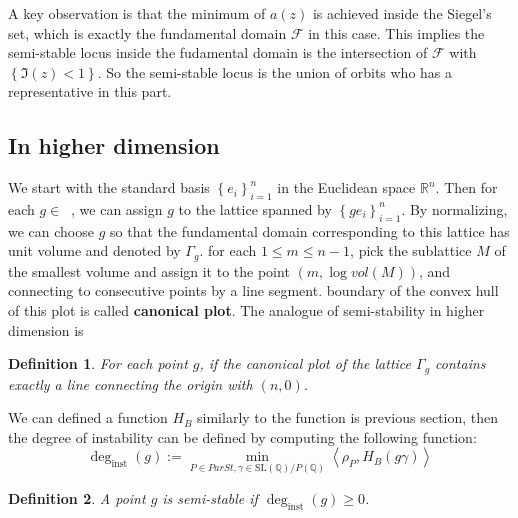 \documentclass[12pt]{article} %
\newtheorem{definition}{Definition}
\DeclareMathOperator{\slnr}{SL_n(\mathbb{R})}
\begin{document}
    A key observation is that the minimum of $a(z)$ is achieved inside the Siegel's set, which is exactly the fundamental domain $\mathcal{F}$ in this case. This implies the semi-stable locus inside the fudamental domain
    is the intersection of $\mathcal{F}$ with $\left\lbrace \Im(z)<1\right\rbrace$. So the semi-stable locus is the union of orbits who has a representative in this part.
    \subsection{In higher dimension}
    We start with the standard basis $\left\lbrace e_i\right\rbrace_{i=1}^n$ in the Euclidean space $\mathbb{R}^n$. Then for each $g \in \slnr$, we can assign $g$ to the lattice
    spanned by $\left\lbrace g e_i\right\rbrace_{i=1}^n$. By normalizing, we can choose $g$ so that the fundamental domain 
    corresponding to this lattice has unit volume and denoted by $\Gamma_g$. for each $ 1 \le m \le n-1$, pick the sublattice $M$ of the smallest volume and 
    assign it to the point $(m,\log vol(M))$, and connecting to consecutive points by a line segment. 
    boundary of the convex hull of this plot is called \textbf{canonical plot}. The analogue of semi-stability in higher dimension is 
    \begin{definition}
        For each point $g$, if the canonical plot of the lattice $\Gamma_g$ contains exactly a line connecting the origin with $(n,0)$.
    \end{definition}
    We can defined a function $H_B$ similarly to the function is previous section, then the degree of instability can be defined by computing 
    the following function:
    \[\deg_{\text{inst}}(g):= \min_{P \in ParSt, \gamma \in \text{SL}(\mathbb{Q})/P(\mathbb{Q})}\left\langle \rho_P, H_B(g\gamma) \right\rangle\]

    \begin{definition}
        A point $g$ is semi-stable if $\deg_{\text{inst}}(g)\ge 0$.
    \end{definition}
\end{document}
